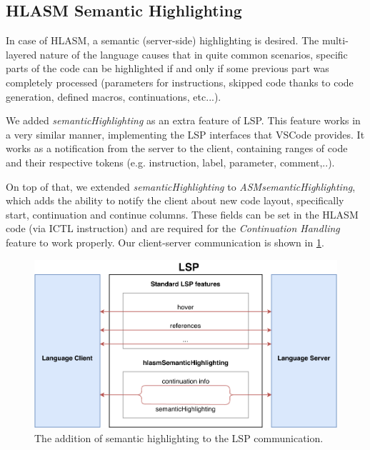 \subsection{HLASM Semantic Highlighting}

In case of HLASM, a semantic (server-side) highlighting is desired. The multi-layered nature of the language causes that in quite common scenarios, specific parts of the code can be highlighted if and only if some previous part was completely processed (parameters for instructions, skipped code thanks to code generation, defined macros, continuations, etc...).

We added \emph{semanticHighlighting} as an extra feature of LSP. This feature works in a very similar manner, implementing the LSP interfaces that VSCode provides. It works as a notification from the server to the client, containing ranges of code and their respective tokens (e.g. instruction, label, parameter, comment,..). 

On top of that, we extended \emph{semanticHighlighting} to \emph{ASMsemanticHighlighting}, which adds the ability to notify the client about new code layout, specifically start, continuation and continue columns. These fields can be set in the HLASM code (via ICTL instruction) and are required for the \emph{Continuation Handling} feature to work properly. Our client-server communication is shown in \cref{fig08:lsp}.


\begin{figure}
	\centering
	\includegraphics[width=\textwidth]{img/lsp_addition}
	\caption{The addition of semantic highlighting to the LSP communication.}
	
	\label{fig08:lsp}
\end{figure}

